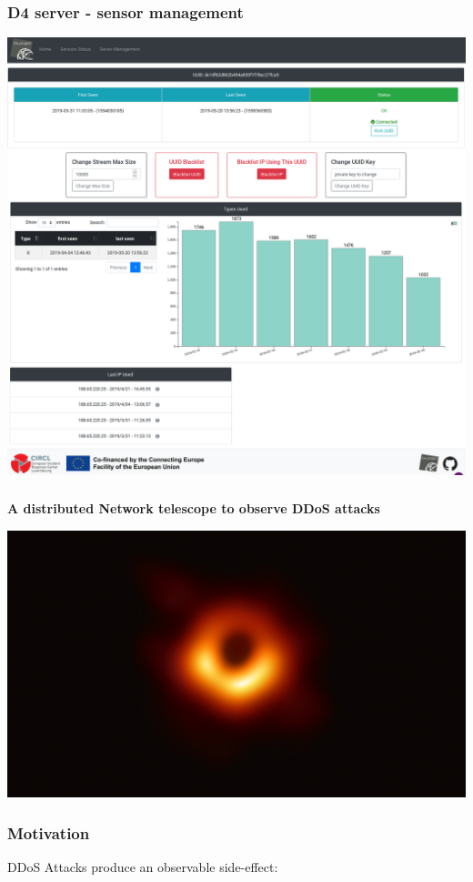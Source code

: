 \documentclass{beamer}
\begin{document}
\begin{frame}
        \frametitle{D4 server - sensor management}
        \includegraphics[width=\textwidth]{./d4-4.png}
\end{frame}

\begin{frame}
        \frametitle{}
        \begin{center}
         {\bf A distributed Network telescope to observe DDoS attacks}
        \end{center}
        \vspace{10pt}
        \begin{center}
          \includegraphics[width=.7\textwidth]{eventhorizon.png}
        \end{center}
\end{frame}

\begin{frame}
        \frametitle{Motivation}
        DDoS Attacks produce an observable side-effect:
        \begin{center}
          \scalebox{0.8}{}
        \end{center}
\end{frame}
\end{document}
